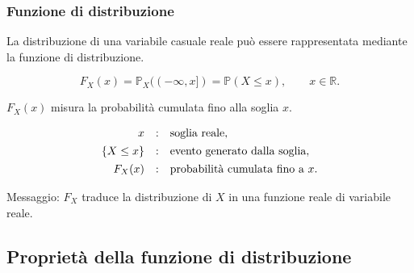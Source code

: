 \documentclass[handout]{beamer}%
\providecommand{\Prob}{\mathbb{P}}
\providecommand{\1}{\mathbf{1}}
\providecommand{\QTR}[2]{\csname #1\endcsname{#2}}
\begin{document}
\begin{frame}%
%

\frametitle{Funzione di distribuzione}%


La distribuzione di una variabile casuale reale pu\`{o} essere rappresentata
mediante la funzione di distribuzione.%

\[
F_{X}(x) = \Prob_{X}((-\infty,x]) = \Prob(X\leq x), \qquad x\in\mathbb{R}.
\]


\medskip

$F_{X}(x)$ misura la probabilit\`{a} cumulata fino alla soglia $x$.

\medskip%

\[%
\begin{array}
[c]{rcl}%
x & : & \mbox{soglia reale},\\[4pt]%
\{X\leq x\} & : & \mbox{evento generato dalla soglia},\\[4pt]%
F_{X}(x) & : & \mbox{probabilit\`{a} cumulata fino a } x.
\end{array}
\]


\medskip

Messaggio: $F_{X}$ traduce la distribuzione di $X$ in una funzione reale di
variabile reale.%

\transboxout
\end{frame}%




\subsection{Propriet\`{a} della funzione di distribuzione}%
\end{document}
